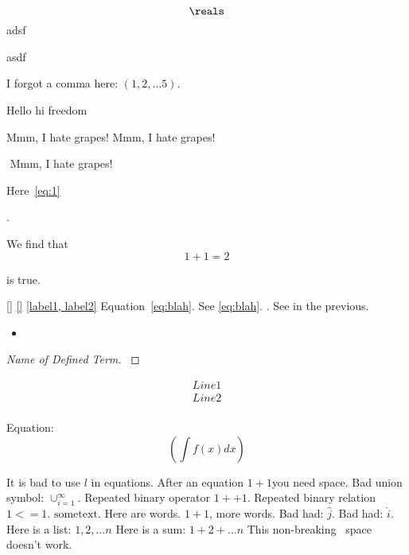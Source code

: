  
  \[{\reals}\]  
adsf  
    
 
asdf

I forgot a comma here: $(1, 2, \dots 5)$.

\cite{} %

Hello hi freedom

Mmm, I hate grapes! 
Mmm, I hate grapes! 

$$ $$ $$ $$
$ $
Mmm, I hate grapes! 


Here~\cref{eq:1}

\[
    
\].

We find that
\[
    1 + 1 = 2
\] 

is true.
 
\ref{} 
\cref{}
\cite{}
\label{\alpha}
\label{a,b} 
\cref{label1, label2}
Equation~\ref{eq:blah}.
See \cref{eq:blah}.
\cite[Theorem 1]{a}. 
See in the previous.


\begin{itemize}
    a
    \item  
\end{itemize}

\begin{proof}[Name of Defined Term]
    \label{def:Name of Defined Term}
    

\end{proof}
\begin{align}
    Line 1 \\
    Line 2 \\
\end{align}

Equation:
\[
    (\int f(x) dx)
\] 


It is bad to use $l$ in equations.
After an equation $1+1$you need space.
Bad union symbol: $\cup_{i=1}^\infty$.
Repeated binary operator $1 ++ 1$.
Repeated binary relation $1 <= 1$.
$\mathrm{some text}$.
Here are words. $1 + 1$, more words.
Bad had: $\hat{j}$.
Bad had: $\hat i$.
Here is a list: $1, 2, \dots n$
Here is a sum: $1 + 2 + \dots n$
This non-breaking~ space doesn't work.

